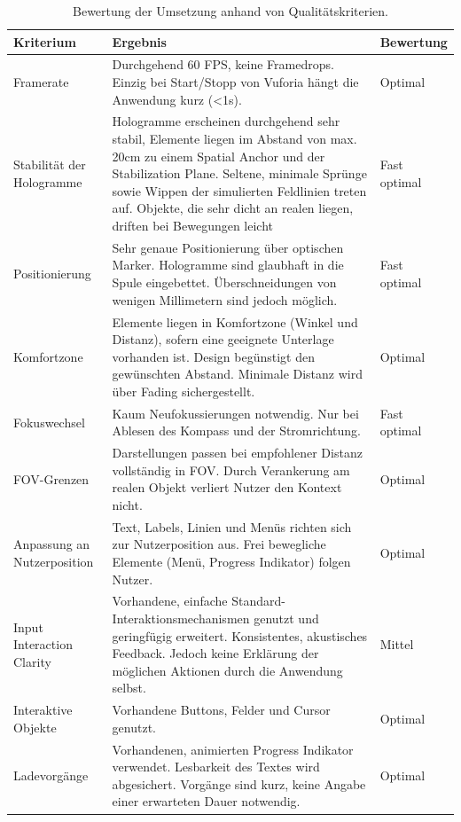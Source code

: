 \begin{landscape}
	\bgroup
	\setlength\extrarowheight{-2pt}
	\def\arraystretch{1.8}
	\begin{table}
		\centering
		\begin{tabular}{m{2.3cm}|m{15.5cm}|m{2cm}}
			Kriterium & Ergebnis & Bewertung\\
			\hline
			\hline
			Framerate & Durchgehend 60 FPS, keine Framedrops. Einzig bei Start/Stopp von Vuforia hängt die Anwendung kurz (<1s). & Optimal\\
			\hline
			Stabilität der Hologramme & Hologramme erscheinen durchgehend sehr stabil, Elemente liegen im Abstand von max. 20cm zu einem Spatial Anchor und der Stabilization Plane. Seltene, minimale Sprünge sowie Wippen der simulierten Feldlinien treten auf. Objekte, die sehr dicht an realen liegen, driften bei Bewegungen leicht & Fast optimal\\
			\hline
			Positionierung & Sehr genaue Positionierung über optischen Marker. Hologramme sind glaubhaft in die Spule eingebettet. Überschneidungen von wenigen Millimetern sind jedoch möglich. & Fast optimal\\
			\hline
			Komfortzone & Elemente liegen in Komfortzone (Winkel und Distanz), sofern eine geeignete Unterlage vorhanden ist. Design begünstigt den gewünschten Abstand. Minimale Distanz wird über Fading sichergestellt. & Optimal\\
			\hline
			Fokuswechsel & Kaum Neufokussierungen notwendig. Nur bei Ablesen des Kompass und der Stromrichtung. & Fast optimal\\
			\hline
			FOV-Grenzen & Darstellungen passen bei empfohlener Distanz vollständig in FOV. Durch Verankerung am realen Objekt verliert Nutzer den Kontext nicht. & Optimal\\
			\hline
			Anpassung an Nutzerposition & Text, Labels, Linien und Menüs richten sich zur Nutzerposition aus. Frei bewegliche Elemente (Menü, Progress Indikator) folgen Nutzer. & Optimal\\
			\hline
			Input Interaction Clarity & Vorhandene, einfache Standard-Interaktionsmechanismen genutzt und geringfügig erweitert. Konsistentes, akustisches Feedback. Jedoch keine Erklärung der möglichen Aktionen durch die Anwendung selbst. & Mittel\\
			\hline
			Interaktive Objekte & Vorhandene Buttons, Felder und Cursor genutzt. & Optimal\\
			\hline
			Ladevorgänge & Vorhandenen, animierten Progress Indikator verwendet. Lesbarkeit des Textes wird abgesichert. Vorgänge sind kurz, keine Angabe einer erwarteten Dauer notwendig. & Optimal\\
		\end{tabular}\caption{\label{tab:tech_results} Bewertung der Umsetzung anhand von Qualitätskriterien.}
	\end{table}
	\egroup
\end{landscape}

